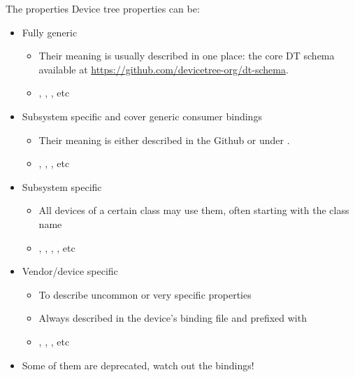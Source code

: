 \begin{frame}[fragile]{The properties}
  Device tree properties can be:
  \begin{itemize}
  \item Fully generic
    \begin{itemize}
    \item Their meaning is usually described in one place: the core DT
      schema available at \url{https://github.com/devicetree-org/dt-schema}.
    \item {}, ,
      , etc
    \end{itemize}
  \item Subsystem specific and cover generic consumer bindings
    \begin{itemize}
    \item Their meaning is either described in the 
      Github or under .
    \item {}, , , etc
    \end{itemize}
  \item Subsystem specific
    \begin{itemize}
    \item All devices of a certain class may use them, often starting
      with the class name
    \item {}, , ,
      , etc
    \end{itemize}
  \item Vendor/device specific
    \begin{itemize}
    \item To describe uncommon or very specific properties
    \item Always described in the device's binding file and prefixed with 
    \item {}, , , etc
    \end{itemize}
  \item Some of them are deprecated, watch out the bindings!
  \end{itemize}
\end{frame}

